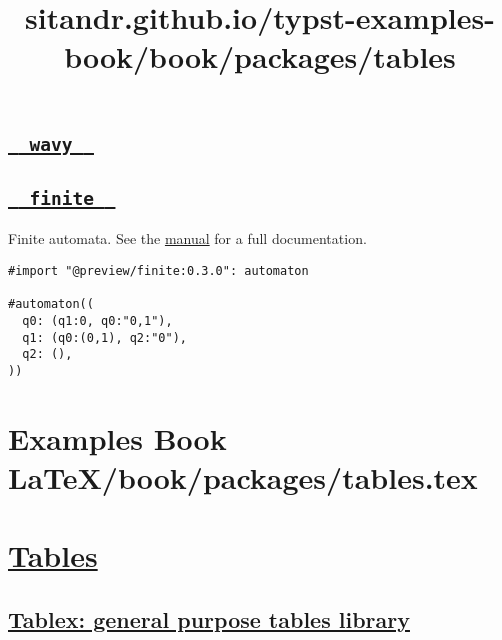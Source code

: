 \pandocbounded{}

\subsection{\texorpdfstring{\hyperref[wavy]{\texttt{\ }{\texttt{\ wavy\ }}\texttt{\ }}}{  wavy  }}\label{wavy}

\subsection{\texorpdfstring{\hyperref[finite]{\texttt{\ }{\texttt{\ finite\ }}\texttt{\ }}}{  finite  }}\label{finite}

Finite automata. See the
\href{https://github.com/jneug/typst-finite/blob/main/manual.pdf}{manual}
for a full documentation.

\begin{verbatim}
#import "@preview/finite:0.3.0": automaton

#automaton((
  q0: (q1:0, q0:"0,1"),
  q1: (q0:(0,1), q2:"0"),
  q2: (),
))
\end{verbatim}

\pandocbounded{}


\section{Examples Book LaTeX/book/packages/tables.tex}
\title{sitandr.github.io/typst-examples-book/book/packages/tables}

\section{\texorpdfstring{\hyperref[tables]{Tables}}{Tables}}\label{tables}

\subsection{\texorpdfstring{\hyperref[tablex-general-purpose-tables-library]{Tablex:
general purpose tables
library}}{Tablex: general purpose tables library}}\label{tablex-general-purpose-tables-library}

